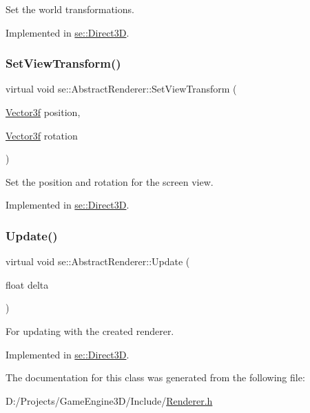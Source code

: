 Set the world transformations. 

Implemented in \mbox{\hyperlink{classse_1_1_direct3_d_a87c8a92e7b236a2f80f29008f22ccc8e}{se\+::\+Direct3D}}.

\mbox{\label{classse_1_1_abstract_renderer_a710e67232e977fbb3b74f79640e0b62e}} 
\subsubsection{\texorpdfstring{Set\+View\+Transform()}{SetViewTransform()}}
{\footnotesize\ttfamily virtual void se\+::\+Abstract\+Renderer\+::\+Set\+View\+Transform (\begin{DoxyParamCaption}\item[{\mbox{\hyperlink{namespacese_a12e07512d95e2fdebdaf74a5ea2cf5f6}{Vector3f}}}]{position,  }\item[{\mbox{\hyperlink{namespacese_a12e07512d95e2fdebdaf74a5ea2cf5f6}{Vector3f}}}]{rotation }\end{DoxyParamCaption})\hspace{0.3cm}{\ttfamily [pure virtual]}}

Set the position and rotation for the screen view. 

Implemented in \mbox{\hyperlink{classse_1_1_direct3_d_a0294b31c151540af98c78d1e33cb369a}{se\+::\+Direct3D}}.

\mbox{\label{classse_1_1_abstract_renderer_aae49e7417663d6a5aca34a2bb37b4b28}} 
\subsubsection{\texorpdfstring{Update()}{Update()}}
{\footnotesize\ttfamily virtual void se\+::\+Abstract\+Renderer\+::\+Update (\begin{DoxyParamCaption}\item[{float}]{delta }\end{DoxyParamCaption})\hspace{0.3cm}{\ttfamily [pure virtual]}}

For updating with the created renderer. 

Implemented in \mbox{\hyperlink{classse_1_1_direct3_d_a39934c194406f108a992d82a4d265381}{se\+::\+Direct3D}}.



The documentation for this class was generated from the following file\+:\begin{DoxyCompactItemize}
\item 
D\+:/\+Projects/\+Game\+Engine3\+D/\+Include/\mbox{\hyperlink{_renderer_8h}{Renderer.\+h}}\end{DoxyCompactItemize}
